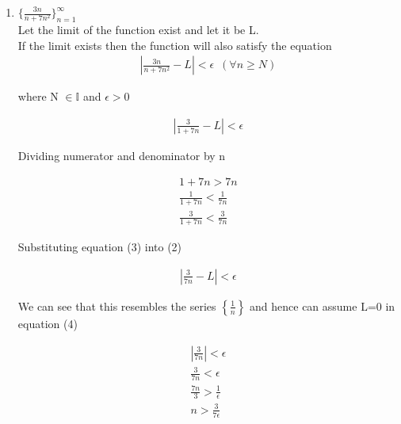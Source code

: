 \documentclass[11pt, letterpaper]{article}
\begin{document}
\begin{enumerate}
{\begin{enumerate}
			\item{$\lbrace \frac{3n}{n+7n^2} \rbrace_{n=1}^\infty$\\
			Let the limit of the function exist and let it be L.\\
			If the limit exists then the function will also satisfy the equation\\
			
			\setcounter{equation}{0}
			\begin{eqnarray}
				\left| \frac{3n}{n + 7n^2} - L \right| < \epsilon \,\,\, (\forall n \geq N)
			\end{eqnarray}						
			
			\begin{center}
				where N $\in \mathbb{I}$ and $\epsilon > 0$
			\end{center}
			
			\begin{eqnarray}
				\left| \frac{3}{1 + 7n} - L \right| < \epsilon 
			\end{eqnarray}
			
			\begin{center}
				Dividing numerator and denominator by n
			\end{center}
			
			\begin{eqnarray}
				1 + 7n > 7n \nonumber \\
				\frac{1}{1+ 7n} < \frac{1}{7n} \nonumber \\
				\frac{3}{1 + 7n} < \frac{3}{7n} 
			\end{eqnarray}
			
			\begin{center}
				Substituting equation (3) into (2)
			\end{center}
			
			\begin{eqnarray}
				\left| \frac{3}{7n} - L \right| < \epsilon 
			\end{eqnarray}
			\begin{center}
				We can see that this resembles the series $\left\lbrace\frac{1}{n} \right\rbrace$ and hence can assume L=0 in equation (4)
				
				\begin{eqnarray}
					\left| \frac{3}{7n} \right| < \epsilon \\
					\frac{3}{7n} < \epsilon \nonumber \\
					\frac{7n}{3} > \frac{1}{\epsilon} \nonumber \\
					n > \frac{3}{7\epsilon}
				\end{eqnarray}
				

\end{center}}
\end{enumerate}}
\end{enumerate}
\end{document}
